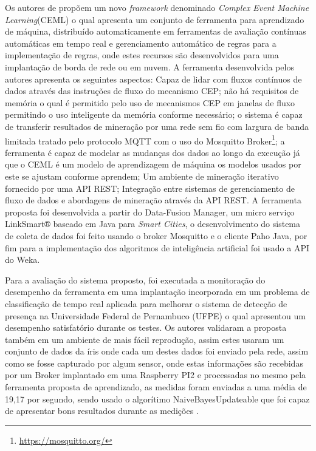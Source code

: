 \documentclass[ti,table]{texufpel} %
\begin{document}
     Os autores de \cite{art10soto2016ceml} propõem um novo \textit{framework} denominado \textit{Complex Event Machine Learning}(CEML) o qual apresenta um conjunto de ferramenta para aprendizado de máquina, distribuído automaticamente em ferramentas de avaliação contínuas automáticas em tempo real e gerenciamento automático de regras para a implementação de regras, onde estes recursos são desenvolvidos para uma implantação de borda de rede ou em nuvem. A ferramenta desenvolvida pelos autores apresenta os seguintes aspectos: Capaz de lidar com fluxos contínuos de dados através das instruções de fluxo do mecanismo CEP; não há requisitos de memória o qual é permitido pelo uso de mecanismos CEP em janelas de fluxo permitindo o uso inteligente da memória conforme necessário; o sistema é capaz de transferir resultados de mineração por uma rede sem fio com largura de banda limitada tratado pelo protocolo MQTT com o uso do Mosquitto Broker\footnote{\url{https://mosquitto.org/}}; a ferramenta é capaz de modelar as mudanças dos dados ao longo da execução já que o CEML é um modelo de aprendizagem de máquina os modelos usados por este se ajustam conforme aprendem; Um ambiente de mineração iterativo fornecido por uma API REST; Integração entre sistemas de gerenciamento de fluxo de dados e abordagens de mineração através da API REST. A ferramenta proposta foi desenvolvida a partir do Data-Fusion Manager, um micro serviço LinkSmart® baseado em Java para \textit{Smart Cities}, o desenvolvimento do sistema de coleta de dados foi feito usando o broker Mosquitto e o cliente Paho Java, por fim para a implementação dos algoritmos de inteligência artificial foi usado a API do Weka.  

     

     Para a avaliação do sistema proposto, foi executada a monitoração do desempenho da ferramenta em uma implantação incorporada em um problema de classificação de tempo real aplicada para melhorar o sistema de detecção de presença na Universidade Federal de Pernambuco (UFPE) o qual apresentou um desempenho satisfatório durante os testes. Os autores validaram a proposta também em um ambiente de mais fácil reprodução, assim estes usaram um conjunto de dados da íris onde cada um destes dados foi enviado pela rede, assim como se fosse capturado por algum sensor,  onde estas informações são recebidas por um Broker implantado em uma Raspberry PI2 e processadas no mesmo pela ferramenta proposta de aprendizado, as medidas foram enviadas a uma média de 19,17 por segundo, sendo usado o algorítimo NaiveBayesUpdateable que foi capaz de apresentar bons resultados durante as medições \cite{art10soto2016ceml}. 
\end{document}
